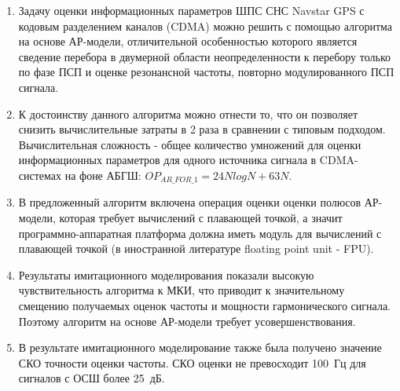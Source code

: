 \begin{enumerate}
\item Задачу оценки информационных параметров ШПС СНС Navstar GPS с кодовым разделением каналов (CDMA) можно решить с помощью алгоритма на основе АР-модели,
	отличительной особенностью которого является сведение перебора в двумерной области неопределенности к перебору только по фазе ПСП и оценке
	резонансной частоты, повторно модулированного ПСП сигнала.

\item К достоинству данного алгоритма можно отнести то, что он позволяет снизить вычислительные затраты в 2 раза в сравнении с типовым подходом.
	Вычислительная сложность - общее количество умножений для оценки информационных параметров для одного источника сигнала в CDMA-системах на фоне АБГШ:
	${OP_{AR\_FOR\_1} = 24NlogN + 63N}$.

\item В предложенный алгоритм включена операция оценки оценки полюсов АР-модели, которая требует вычислений с плавающей точкой, а значит программно-аппаратная
	платформа должна иметь модуль для вычислений с плавающей точкой (в иностранной литературе floating point unit - FPU).

\item Результаты имитационного моделирования показали высокую чувствительность алгоритма к МКИ, что приводит к значительному смещению получаемых оценок
	частоты и мощности гармонического сигнала. Поэтому алгоритм на основе АР-модели требует усовершенствования.

\item В результате имитационного моделирование также была получено значение СКО точности оценки частоты. СКО оценки не превосходит \mbox{100 Гц} для сигналов
	с ОСШ более \mbox{25 дБ}.

\end{enumerate}

